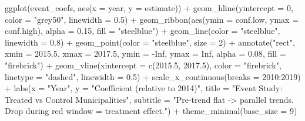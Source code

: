 \documentclass[
  11pt,
  letterpaper,
  DIV=11,
  numbers=noendperiod]{scrartcl}
\newenvironment{Shaded}{}{}
\newcommand{\AttributeTok}[1]{\textcolor[rgb]{0.84,0.23,0.29}{#1}}
\newcommand{\ConstantTok}[1]{\textcolor[rgb]{0.00,0.36,0.77}{#1}}
\newcommand{\DecValTok}[1]{\textcolor[rgb]{0.00,0.36,0.77}{#1}}
\newcommand{\FloatTok}[1]{\textcolor[rgb]{0.00,0.36,0.77}{#1}}
\newcommand{\FunctionTok}[1]{\textcolor[rgb]{0.44,0.26,0.76}{#1}}
\newcommand{\NormalTok}[1]{\textcolor[rgb]{0.14,0.16,0.18}{#1}}
\newcommand{\SpecialCharTok}[1]{\textcolor[rgb]{0.00,0.36,0.77}{#1}}
\newcommand{\StringTok}[1]{\textcolor[rgb]{0.01,0.18,0.38}{#1}}
\begin{document}
\begin{Shaded}
\begin{Highlighting}[]
\FunctionTok{ggplot}\NormalTok{(event\_coefs, }\FunctionTok{aes}\NormalTok{(}\AttributeTok{x =}\NormalTok{ year, }\AttributeTok{y =}\NormalTok{ estimate)) }\SpecialCharTok{+}
  \FunctionTok{geom\_hline}\NormalTok{(}\AttributeTok{yintercept =} \DecValTok{0}\NormalTok{, }\AttributeTok{color =} \StringTok{"grey50"}\NormalTok{, }\AttributeTok{linewidth =} \FloatTok{0.5}\NormalTok{) }\SpecialCharTok{+}
  \FunctionTok{geom\_ribbon}\NormalTok{(}\FunctionTok{aes}\NormalTok{(}\AttributeTok{ymin =}\NormalTok{ conf.low, }\AttributeTok{ymax =}\NormalTok{ conf.high), }\AttributeTok{alpha =} \FloatTok{0.15}\NormalTok{, }\AttributeTok{fill =} \StringTok{"steelblue"}\NormalTok{) }\SpecialCharTok{+}
  \FunctionTok{geom\_line}\NormalTok{(}\AttributeTok{color =} \StringTok{"steelblue"}\NormalTok{, }\AttributeTok{linewidth =} \FloatTok{0.8}\NormalTok{) }\SpecialCharTok{+}
  \FunctionTok{geom\_point}\NormalTok{(}\AttributeTok{color =} \StringTok{"steelblue"}\NormalTok{, }\AttributeTok{size =} \DecValTok{2}\NormalTok{) }\SpecialCharTok{+}
  \FunctionTok{annotate}\NormalTok{(}\StringTok{"rect"}\NormalTok{, }\AttributeTok{xmin =} \FloatTok{2015.5}\NormalTok{, }\AttributeTok{xmax =} \FloatTok{2017.5}\NormalTok{, }\AttributeTok{ymin =} \SpecialCharTok{{-}}\ConstantTok{Inf}\NormalTok{, }\AttributeTok{ymax =} \ConstantTok{Inf}\NormalTok{,}
           \AttributeTok{alpha =} \FloatTok{0.08}\NormalTok{, }\AttributeTok{fill =} \StringTok{"firebrick"}\NormalTok{) }\SpecialCharTok{+}
  \FunctionTok{geom\_vline}\NormalTok{(}\AttributeTok{xintercept =} \FunctionTok{c}\NormalTok{(}\FloatTok{2015.5}\NormalTok{, }\FloatTok{2017.5}\NormalTok{),}
             \AttributeTok{color =} \StringTok{"firebrick"}\NormalTok{, }\AttributeTok{linetype =} \StringTok{"dashed"}\NormalTok{, }\AttributeTok{linewidth =} \FloatTok{0.5}\NormalTok{) }\SpecialCharTok{+}
  \FunctionTok{scale\_x\_continuous}\NormalTok{(}\AttributeTok{breaks =} \DecValTok{2010}\SpecialCharTok{:}\DecValTok{2019}\NormalTok{) }\SpecialCharTok{+}
  \FunctionTok{labs}\NormalTok{(}\AttributeTok{x =} \StringTok{"Year"}\NormalTok{, }\AttributeTok{y =} \StringTok{"Coefficient (relative to 2014)"}\NormalTok{,}
       \AttributeTok{title =} \StringTok{"Event Study: Treated vs Control Municipalities"}\NormalTok{,}
       \AttributeTok{subtitle =} \StringTok{"Pre{-}trend flat {-}\textgreater{} parallel trends. Drop during red window = treatment effect."}\NormalTok{) }\SpecialCharTok{+}
  \FunctionTok{theme\_minimal}\NormalTok{(}\AttributeTok{base\_size =} \DecValTok{9}\NormalTok{)}
\end{Highlighting}
\end{Shaded}
\end{document}
